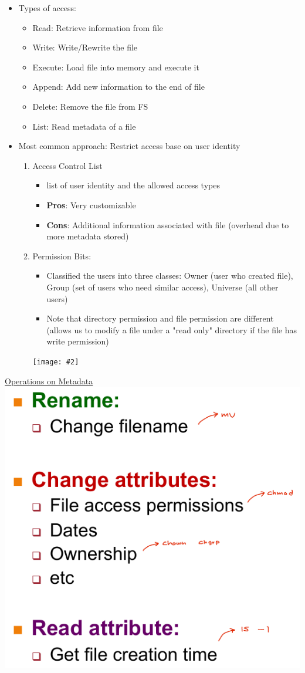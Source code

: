\documentclass[13pt,landscape,a4paper]{article}
\newcommand\ctrimg[2][0.8]{\begin{center}\texttt{[image: \#2]} \end{center}}
\begin{document}
\begin{multicols*}{3}
\begin{itemize}
            \item Types of access:
            \begin{itemize}
                \item Read: Retrieve information from file
                \item Write: Write/Rewrite the file
                \item Execute: Load file into memory and execute it
                \item Append: Add new information to the end of file
                \item Delete: Remove the file from FS
                \item List: Read metadata of a file
            \end{itemize}
            \item Most common approach: Restrict access base on user identity
            \begin{enumerate}
                \item Access Control List
                \begin{itemize}
                    \item list of user identity and the allowed access types
                    \item \textbf{Pros}: Very customizable
                    \item \textbf{Cons}: Additional information associated with file (overhead due to more metadata stored)
                \end{itemize}
                \item Permission Bits:
                \begin{itemize}
                    \item Classified the users into three classes: Owner (user who created file), Group (set of users who need similar access), Universe (all other users)
                    \item Note that directory permission and file permission are different (allows us to modify a file under a "read only" directory if the file has write permission)
                \end{itemize}
                \ctrimg[0.4]{perm_bits}
            \end{enumerate}
        \end{itemize}
        \underline{Operations on Metadata}\\
        \includegraphics[width=0.35\columnwidth]{ops_on_metadata}

\end{multicols*}
\end{document}
